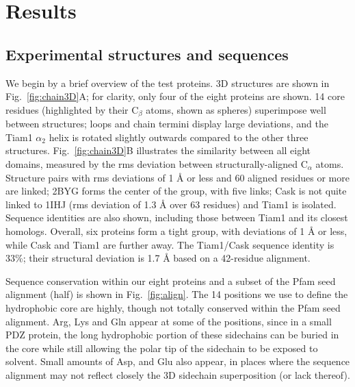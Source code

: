 \documentclass[12pt]{article}
\begin{document}
\section{Results}
\subsection{Experimental structures and sequences}
We begin by a brief overview of the test proteins. 3D structures are shown in Fig.\ \ref{fig:chain3D}A; for clarity, only
four of the eight proteins are shown. 14 core residues (highlighted by their C$_{\beta}$ atoms, shown as spheres) superimpose
well between structures; loops and chain termini display large deviations, and the Tiam1 $\alpha_2$ helix is rotated slightly
outwards compared to the other three structures. Fig.\ \ref{fig:chain3D}B illustrates the similarity between all eight domains,
measured by the rms deviation between structurally-aligned C$_{\alpha}$ atoms. Structure pairs with rms deviations of 1 {\AA}
or less and 60 aligned residues or more are linked; 2BYG forms the center of the group, with five links; Cask is not quite
linked to 1IHJ (rms deviation of 1.3 {\AA} over 63 residues) and Tiam1 is isolated. Sequence identities are also shown, including
those between Tiam1 and its closest homologs. Overall, six proteins form a tight group, with deviations of 1 {\AA} or less,
while Cask and Tiam1 are further away. The Tiam1/Cask sequence identity is 33\%; their structural deviation is 1.7 {\AA} based
on a 42-residue alignment. 

Sequence conservation within our eight proteins and a subset of the Pfam seed alignment (half) is shown in Fig.\ \ref{fig:align}.
The 14 positions we use to define the hydrophobic core are highly, though not totally conserved within the Pfam seed alignment.
Arg, Lys and Gln appear at some of the positions, since in a small PDZ protein, the long hydrophobic portion of these sidechains
can be buried in the core while still allowing the polar tip of the sidechain to be exposed to solvent. Small amounts of Asp, and
Glu also appear, in places where the sequence alignment may not reflect closely the 3D sidechain superposition (or lack thereof).
\end{document}
